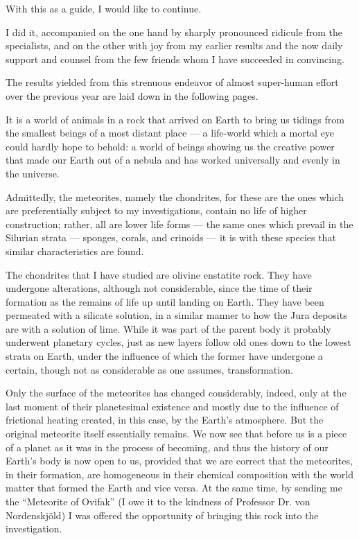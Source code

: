 \documentclass[a4paper, 12pt, oneside]{article}
\begin{document}
With this as a guide, I would like to continue.

I did it, accompanied on the one hand by sharply pronounced ridicule from the specialists, and on the other with joy from my earlier results and the now daily support and counsel from the few friends whom I have succeeded in convincing.

The results yielded from this strenuous endeavor of almost super-human effort over the previous year are laid down in the following pages.

It is a world of animals in a rock that arrived on Earth to bring us tidings from the smallest beings of a most distant place — a life-world which a mortal eye could hardly hope to behold: a world of beings showing us the creative power that made our Earth out of a nebula and has worked universally and evenly in the universe.

Admittedly, the meteorites, namely the chondrites, for these are the ones which are preferentially subject to my investigations, contain no life of higher construction; rather, all are lower life forms — the same ones which prevail in the Silurian strata — sponges, corals, and crinoids — it is with these species that similar characteristics are found.

The chondrites that I have studied are olivine enstatite rock. They have undergone alterations, although not considerable, since the time of their formation as the remains of life up until landing on Earth. They have been permeated with a silicate solution, in a similar manner to how the Jura deposits are with a solution of lime. While it was part of the parent body it probably underwent planetary cycles, just as new layers follow old ones down to the lowest strata on Earth, under the influence of which the former have undergone a certain, though not as considerable as one assumes, transformation.

Only the surface of the meteorites has changed considerably, indeed, only at the last moment of their planetesimal existence and mostly due to the influence of frictional heating created, in this case, by the Earth's atmosphere. But the original meteorite itself essentially remains. We now see that before us is a piece of a planet as it was in the process of becoming, and thus the history of our Earth's body is now open to us, provided that we are correct that the meteorites, in their formation, are homogeneous in their chemical composition with the world matter that formed the Earth and vice versa. At the same time, by sending me the ``Meteorite of Ovifak'' (I owe it to the kindness of Professor Dr. von Nordenskjöld) I was offered the opportunity of bringing this rock into the investigation.
\end{document}

